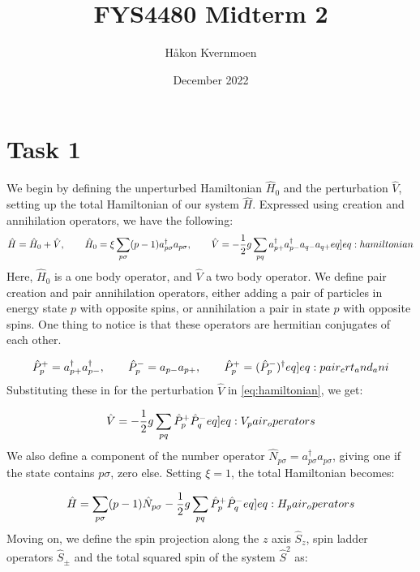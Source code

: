\documentclass{article}
\title{FYS4480 Midterm 2}
\author{Håkon Kvernmoen}
\date{December 2022}
\newcommand{\crt}[1]{a_{#1}^{\dagger}}
\newcommand{\ani}[1]{a_{#1}}
\newcommand{\spinop}[1]{\hat{S}_{#1}}
\newcommand{\pplus}[1]{\hat{P}_{#1}^{+}}
\newcommand{\pminus}[1]{\hat{P}_{#1}^{-}}
\newcommand{\numberop}[1]{\hat{N}_{#1}}
\begin{document}
\maketitle

\section*{Task 1}
We begin by defining the unperturbed Hamiltonian $\hat{H}_0$ and the perturbation $\hat{V}$, setting up the total Hamiltonian of our system $\hat{H}$. Expressed using creation and annihilation operators, we have the following:
\begin{align}
    \hat{H} = \hat{H}_0 + \hat{V},\hspace{20px} \hat{H}_0 = \xi\sum_{p\sigma} (p-1)\crt{p\sigma}\ani{p\sigma}, \hspace{20px}\hat{V} = -\frac{1}{2}g\sum_{pq}\crt{p+}\crt{p-}\ani{q-}\ani{q+} \label[eq]{eq:hamiltonian}
\end{align}
Here, $\hat{H}_0$ is a one body operator, and $\hat{V}$ a two body operator. We define pair creation and pair annihilation operators, either adding a pair of particles in energy state $p$ with opposite spins, or annihilation a pair in state $p$ with opposite spins. One thing to notice is that these operators are hermitian conjugates of each other.

\begin{align}
    \pplus{p} = \crt{p+} \crt{p-},\hspace{20px}\pminus{p} = \ani{p-}\ani{p+},\hspace{20px}\pplus{p} = (\pminus{p})^\dagger \label[eq]{eq:pair_crt_and_ani}
\end{align}
Substituting these in for the perturbation $\hat{V}$ in \cref{eq:hamiltonian}, we get:

\begin{align}
    \hat{V} = -\frac{1}{2}g\sum_{pq} \pplus{p} \pminus{q} \label[eq]{eq:V_pair_operators}
\end{align}
We also define a component of the number operator $\numberop{p\sigma} = \crt{p\sigma}\ani{p\sigma}$, giving one if the state contains $p\sigma$, zero else. Setting $\xi = 1$, the total Hamiltonian becomes:

\begin{align}
    \hat{H} = \sum_{p\sigma} (p-1)\numberop{p\sigma} -\frac{1}{2}g\sum_{pq} \pplus{p} \pminus{q} \label[eq]{eq:H_pair_operators}
\end{align}
Moving on, we define the spin projection along the $z$ axis $\spinop{z}$, spin ladder operators $\spinop{\pm}$ and the total squared spin of the system $\spinop{}^2$ as: 
\end{document}
